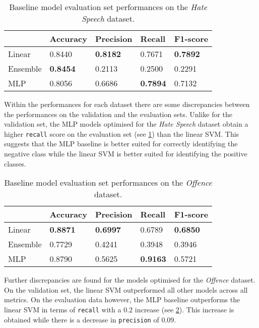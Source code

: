 \begin{table}[h]
  \centering
  \begin{tabular}{l|llll}
             & Accuracy        & Precision       & Recall          & F1-score        \\\hline
    Linear   & 0.8440          & \textbf{0.8182} & 0.7671          & \textbf{0.7892} \\
    Ensemble & \textbf{0.8454} & 0.2113          & 0.2500          & 0.2291          \\
    MLP      & 0.8056          & 0.6686          & \textbf{0.7894} & 0.7132
  \end{tabular}
  \caption{Baseline model evaluation set performances on the \textit{Hate Speech} dataset.}
  \label{tab:baseline_test_wh}
\end{table}

Within the performances for each dataset there are some discrepancies between the performances on the validation and the evaluation sets.
Unlike for the validation set, the MLP models optimised for the \textit{Hate Speech} dataset obtain a higher \texttt{recall} score on the evaluation set (see \cref{tab:baseline_test_wh}) than the linear SVM.
This suggests that the MLP baseline is better suited for correctly identifying the negative class while the linear SVM is better suited for identifying the positive classes.

\begin{table}[h]
  \centering
  \begin{tabular}{l|llll}
             & Accuracy        & Precision       & Recall          & F1-score        \\\hline
    Linear   & \textbf{0.8871} & \textbf{0.6997} & 0.6789          & \textbf{0.6850} \\
    Ensemble & 0.7729          & 0.4241          & 0.3948          & 0.3946          \\
    MLP      & 0.8790          & 0.5625          & \textbf{0.9163} & 0.5721
  \end{tabular}
  \caption{Baseline model evaluation set performances on the \textit{Offence} dataset.}
  \label{tab:baseline_test_davidson}
\end{table}

Further discrepancies are found for the models optimised for the \textit{Offence} dataset.
On the validation set, the linear SVM outperformed all other models across all metrics.
On the evaluation data however, the MLP baseline outperforms the linear SVM in terms of \texttt{recall} with a $0.2$ increase (see \cref{tab:baseline_test_davidson}).
This increase is obtained while there is a decrease in \texttt{precision} of $0.09$.

